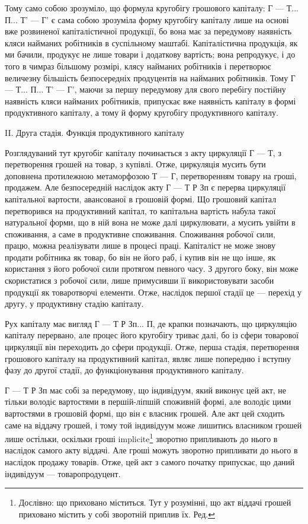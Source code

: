 Тому само собою зрозуміло, що формула кругобігу грошового капіталу:
Г — Т... П... Т' — Г' є сама собою зрозуміла форму кругобігу капіталу
лише на основі вже розвиненої капіталістичної продукції, бо вона
має за передумову наявність кляси найманих робітників в суспільному
маштабі. Капіталістична продукція, як ми бачили, продукує не
лише товари і додаткову вартість; вона репродукує, і до того в чимраз
більшому розмірі, клясу найманих робітників і перетворює величезну
більшість безпосередніх продуцентів на найманих робітників. Тому
Г — Т... П... Т' — Г', маючи за першу передумову для свого перебігу
постійну наявність кляси найманих робітників, припускає вже наявність
капіталу в формі продуктивного капіталу, а тому й форму кругобігу
продуктивного капіталу.

II. Друга стадія. Функція продуктивного капіталу

Розглядуваний тут кругобіг капіталу починається з акту циркуляції
Г — Т, з перетворення грошей на товар, з купівлі. Отже, циркуляція
мусить бути доповнена протилежною метаморфозою Т — Г, перетворенням
товару на гроші, продажем. Але безпосередній наслідок акту
Г — Т Р Зп є перерва циркуляції капітальної вартости, авансованої в
грошовій формі. Що грошовий капітал перетворився на продуктивний
капітал, то капітальна вартість набула такої натуральної форми, що в
ній вона не може далі циркулювати, а мусить увійти в споживання, а
саме в продуктивне споживання. Споживання робочої сили, працю, можна
реалізувати лише в процесі праці. Капіталіст не може знову продати
робітника як товар, бо він не його раб, і купив він не що інше, як
користання з його робочої сили протягом певного часу. З другого боку,
він може скористатися з робочої сили, лише примусивши її використовувати
засоби продукції як товаротворчі елементи. Отже, наслідок першої
стадії це — перехід у другу, у продуктивну стадію капіталу.

Рух капіталу має вигляд Г — Т Р Зп... П, де крапки позначають, що
циркуляцію капіталу перервано, але процес його кругобігу триває далі,
бо із сфери товарової циркуляції він переходить до сфери продукції.
Отже, перша стадія, перетворення грошового капіталу на продуктивний
капітал, являє лише попередню і вступну фазу до другої стадії, до
функціонування продуктивного капіталу.

Г — Т Р Зп має собі за передумову, що індивідуум, який виконує цей
акт, не тільки володіє вартостями в першій-ліпшій споживній формі,
але володіє цими вартостями в грошовій формі, що він є власник грошей.
Але акт цей сходить саме на віддачу грошей, і тому той індивідуум
може лишитись власником грошей лише остільки, оскільки гроші
implicite\footnote*{
Дослівно: що приховано міститься. Тут у розумінні, що акт віддачі грошей приховано містить у собі 
зворотній приплив їх. Ред.
} зворотно припливають до нього в наслідок самого акту віддачі.
Але гроші можуть зворотно припливати до нього в наслідок продажу товарів. Отже, цей акт з
самого початку припускає, що даний індивідуум — товаропродуцент.

